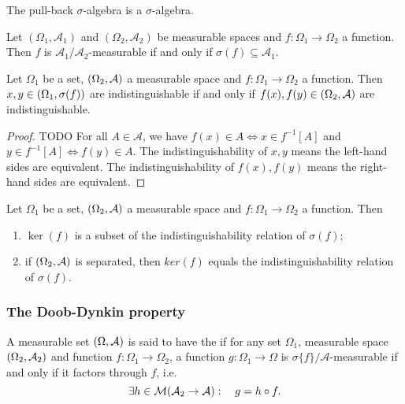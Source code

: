 The pull-back $\sigma$-algebra is a $\sigma$-algebra.

\begin{lemma}
Let $(\Omega_1, \mathcal{A}_1)$ and $(\Omega_2, \mathcal{A}_2)$ be measurable spaces and $f: \Omega_1\to \Omega_2$ a function. Then $f$ is $\mathcal{A}_1/\mathcal{A}_2$-measurable \textup{if and only if} $\sigma(f) \subseteq \mathcal{A}_1$.
\end{lemma}

\begin{lemma}
Let $\Omega_1$ be a set, $\left( \Omega_2, \mathcal{A} \right)$ a measurable space and $f: \Omega_1\to \Omega_2$ a function. Then $x,y\in \left( \Omega_1,\sigma(f) \right)$ are indistinguishable \textup{if and only if} $f(x), f(y) \in \left( \Omega_2,\mathcal{A} \right)$ are indistinguishable.
\end{lemma}
\begin{proof}
TODO For all $A\in\mathcal{A}$, we have $f(x)\in A \iff x\in f^{-1}[A]$ and $y\in f^{-1}[A]\iff f(y)\in A$. The indistinguishability of $x,y$ means the left-hand sides are equivalent. The indistinguishability of $f(x),f(y)$ means the right-hand sides are equivalent.
\end{proof}
\begin{corollary}
Let $\Omega_1$ be a set, $\left( \Omega_2, \mathcal{A} \right)$ a measurable space and $f: \Omega_1\to \Omega_2$ a function. Then
\begin{enumerate}
\item $\ker(f)$ is a subset of the indistinguishability relation of $\sigma(f)$;
\item if $\left( \Omega_2, \mathcal{A} \right)$ is separated, then $ker(f)$ equals the indistinguishability relation of $\sigma(f)$.
\end{enumerate}
\end{corollary}


\subsubsection{The Doob-Dynkin property}
\begin{definition}
A measurable set $\left( \Omega,\mathcal{A} \right)$ is said to have the  if for any set $\Omega_1$, measurable space $\left( \Omega_2,\mathcal{A}_2 \right)$ and function $f: \Omega_1 \to \Omega_2$, a function $g: \Omega_1\to \Omega$ is $\sigma\{f\}/\mathcal{A}$-measurable \textup{if and only if} it factors through $f$, i.e.
\[\exists h\in \operatorname{\mathcal{M}}(\mathcal{A}_2\to \mathcal{A}):\quad g = h\circ f. \]
\end{definition}

